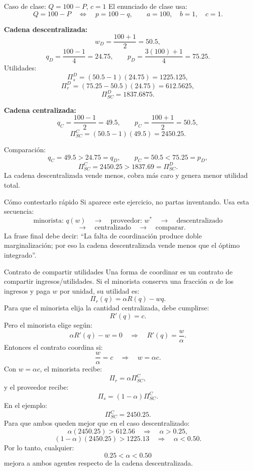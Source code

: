 \begin{ejercicio}{Caso de clase: \(Q=100-P\), \(c=1\)}
El enunciado de clase usa:
\[
Q=100-P
\quad\Leftrightarrow\quad
p=100-q,
\qquad
a=100,\quad b=1,\quad c=1.
\]

\textbf{Cadena descentralizada:}
\[
w_D=\frac{100+1}{2}=50.5,
\]
\[
q_D=\frac{100-1}{4}=24.75,
\qquad
p_D=\frac{3(100)+1}{4}=75.25.
\]
Utilidades:
\[
\Pi_s^D=(50.5-1)(24.75)=1225.125,
\]
\[
\Pi_r^D=(75.25-50.5)(24.75)=612.5625,
\]
\[
\Pi_{SC}^D=1837.6875.
\]

\textbf{Cadena centralizada:}
\[
q_C=\frac{100-1}{2}=49.5,
\qquad
p_C=\frac{100+1}{2}=50.5,
\]
\[
\Pi_{SC}^C=(50.5-1)(49.5)=2450.25.
\]

Comparación:
\[
q_C=49.5>24.75=q_D,
\qquad
p_C=50.5<75.25=p_D,
\]
\[
\Pi_{SC}^C=2450.25>1837.69=\Pi_{SC}^D.
\]
La cadena descentralizada vende menos, cobra más caro y genera menor utilidad total.
\end{ejercicio}

\begin{tipprueba}{Cómo contestarlo rápido}
Si aparece este ejercicio, no partas inventando. Usa esta secuencia:
\[
\text{minorista: } q(w)
\quad\rightarrow\quad
\text{proveedor: } w^*
\quad\rightarrow\quad
\text{descentralizado}
\]
\[
\quad\rightarrow\quad
\text{centralizado}
\quad\rightarrow\quad
\text{comparar}.
\]
La frase final debe decir: ``La falta de coordinación produce doble marginalización; por eso la cadena descentralizada vende menos que el óptimo integrado''.
\end{tipprueba}

\begin{formulas}{Contrato de compartir utilidades}
Una forma de coordinar es un contrato de compartir ingresos/utilidades. Si el minorista conserva una fracción \(\alpha\) de los ingresos y paga \(w\) por unidad, su utilidad es:
\[
\Pi_r(q)=\alpha R(q)-wq.
\]
Para que el minorista elija la cantidad centralizada, debe cumplirse:
\[
R'(q)=c.
\]
Pero el minorista elige según:
\[
\alpha R'(q)-w=0
\quad\Rightarrow\quad
R'(q)=\frac{w}{\alpha}.
\]
Entonces el contrato coordina si:
\[
\frac{w}{\alpha}=c
\quad\Rightarrow\quad
w=\alpha c.
\]
Con \(w=\alpha c\), el minorista recibe:
\[
\Pi_r=\alpha \Pi_{SC}^C,
\]
y el proveedor recibe:
\[
\Pi_s=(1-\alpha)\Pi_{SC}^C.
\]
En el ejemplo:
\[
\Pi_{SC}^C=2450.25.
\]
Para que ambos queden mejor que en el caso descentralizado:
\[
\alpha(2450.25)>612.56
\quad\Rightarrow\quad
\alpha>0.25,
\]
\[
(1-\alpha)(2450.25)>1225.13
\quad\Rightarrow\quad
\alpha<0.50.
\]
Por lo tanto, cualquier:
\[
\boxed{0.25<\alpha<0.50}
\]
mejora a ambos agentes respecto de la cadena descentralizada.
\end{formulas}

